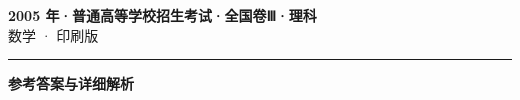 \documentclass[zihao=5, a4paper]{ctexart}
\begin{document}
\begin{center}
  {\Large\bfseries 2005 年·普通高等学校招生考试·全国卷Ⅲ·理科}\\[4pt]
  {\large 数学 · 印刷版}
\end{center}
\medskip
{}

\par\bigskip\hrule\bigskip
{}
\begin{center}{\large\bfseries 参考答案与详细解析}\end{center}
\smallskip

\end{document}
